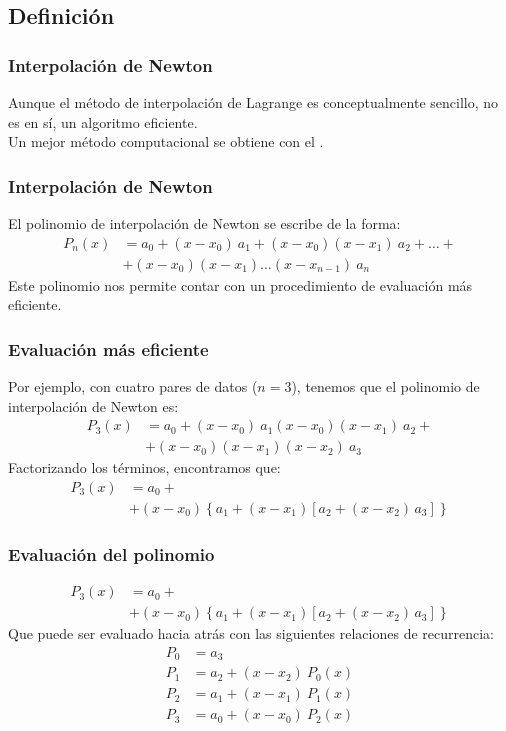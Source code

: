 \subsection{Definición}
\begin{frame}
\frametitle{Interpolación de Newton}
Aunque el método de interpolación de Lagrange es conceptualmente sencillo, no es en sí, un algoritmo eficiente.
\\
\medskip
Un mejor método computacional se obtiene con el .
\end{frame}
\begin{frame}
\frametitle{Interpolación de Newton}
El polinomio de interpolación de Newton se escribe de la forma:
\fontsize{12}{12}\selectfont
\begin{align*}
P_{n}(x) &= a_{0} + (x - x_{0}) \: a_{1} + (x - x_{0})(x - x_{1}) \: a_{2} + \ldots + \\
&+ (x - x_{0})(x - x_{1}) \ldots (x - x_{n - 1}) \: a_{n} 
\end{align*}
\fontsize{14}{14}\selectfont
\pause
Este polinomio nos permite contar con un procedimiento de evaluación más eficiente.
\end{frame}
\begin{frame}
\frametitle{Evaluación más eficiente}
Por ejemplo, con cuatro pares de datos ($n = 3$), tenemos que el polinomio de interpolación de Newton es:
\begin{align*}
P_{3}(x) &= a_{0} + (x - x_{0}) \: a_{1} (x - x_{0})(x - x_{1}) \: a_{2} + \\		
&+ (x - x_{0})(x - x_{1})(x - x_{2}) \: a_{3}
\end{align*}
\pause
Factorizando los términos, encontramos que:
\begin{align*}
P_{3}(x) &= a_{0} + \\
&+ (x - x_{0}) \left\{ a_{1}+(x - x_{1}) \left[ a_{2} + (x - x_{2}) \, a_{3} \right] \right\}
\end{align*}
\end{frame}
\begin{frame}
\frametitle{Evaluación del polinomio}
\begin{align*}
P_{3}(x) &= a_{0} + \\
&+ (x - x_{0}) \left\{ a_{1}+(x - x_{1}) \left[ a_{2} + (x - x_{2}) \, a_{3} \right] \right\}
\end{align*}
Que puede ser evaluado hacia atrás con las siguientes relaciones de recurrencia:
\begin{align*}
P_{0} &= a_{3} \\
P_{1} &= a_{2} + (x - x_{2}) \: P_{0}(x) \\
P_{2} &= a_{1} + (x - x_{1}) \: P_{1}(x) \\
P_{3} &= a_{0} + (x - x_{0}) \: P_{2}(x) 
\end{align*}
\end{frame}
